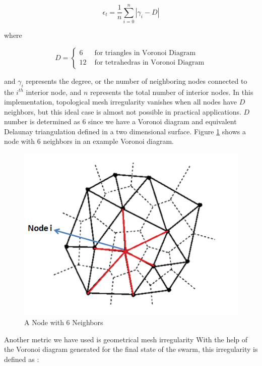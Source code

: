 \begin{equation}
\epsilon _t = \frac{1}{n} \sum_{i = 0}^{n} |\gamma _i - D|
\end{equation}
	
where 

\begin{equation}
D = \left\{ \begin{array}{rl}
6                               &\mbox{ for triangles in Voronoi Diagram} \\
12                             &\mbox{ for tetrahedras in Voronoi Diagram}
\end{array} \right.
\end{equation}
	
and $\gamma _i$ represents the degree, or the number of neighboring nodes connected to the $i^{th}$ interior node, and $n$ represents the total number of interior nodes. In this implementation, topological mesh irregularity vanishes when all nodes have $D$ neighbors, but this ideal case is almost not possible in practical applications. $D$ number is determined as 6 since we have a Voronoi diagram and equivalent Delaunay triangulation defined in a two dimensional surface. Figure \ref{6komusulunode} shows a node with 6 neighbors in an example Voronoi diagram.
	
\begin{figure}[H]
\caption{A Node with 6 Neighbors} \label{6komusulunode}
\centering
\includegraphics[scale = 0.70]{voronoi}
\end{figure}

Another metric we have used is geometrical mesh irregularity \cite{27}
With the help of the Voronoi diagram generated for the final state of the swarm, this irregularity is defined as \cite{27}:

